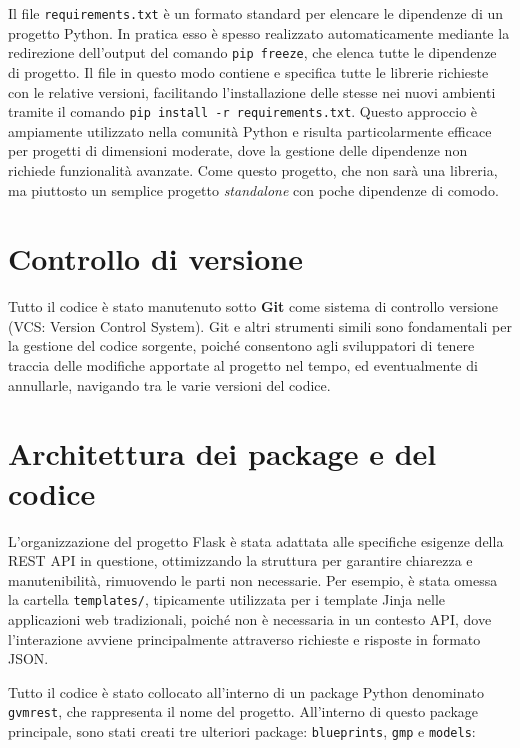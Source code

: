 Il file \texttt{requirements.txt} è un formato standard per elencare le dipendenze di un progetto Python. In pratica esso è spesso realizzato automaticamente mediante la redirezione dell'output del comando \texttt{pip freeze}, che elenca tutte le dipendenze di progetto. Il file in questo modo contiene e specifica tutte le librerie richieste con le relative versioni, facilitando l'installazione delle stesse nei nuovi ambienti tramite il comando \texttt{pip install -r requirements.txt}. Questo approccio è ampiamente utilizzato nella comunità Python e risulta particolarmente efficace per progetti di dimensioni moderate, dove la gestione delle dipendenze non richiede funzionalità avanzate. Come questo progetto, che non sarà una libreria, ma piuttosto un semplice progetto \emph{standalone} con poche dipendenze di comodo.

\section{Controllo di versione}
Tutto il codice è stato manutenuto sotto \textbf{Git} come sistema di controllo versione (VCS: Version Control System). Git e altri strumenti simili sono fondamentali per la gestione del codice sorgente, poiché consentono agli sviluppatori di tenere traccia delle modifiche apportate al progetto nel tempo, ed eventualmente di annullarle, navigando tra le varie versioni del codice.

\section{Architettura dei package e del codice}
L'organizzazione del progetto Flask è stata adattata alle specifiche esigenze della REST API in questione, ottimizzando la struttura per garantire chiarezza e manutenibilità, rimuovendo le parti non necessarie. Per esempio, è stata omessa la cartella \texttt{templates/}, tipicamente utilizzata per i template Jinja nelle applicazioni web tradizionali, poiché non è necessaria in un contesto API, dove l'interazione avviene principalmente attraverso richieste e risposte in formato JSON.

Tutto il codice è stato collocato all'interno di un package Python denominato \texttt{gvmrest}, che rappresenta il nome del progetto. All'interno di questo package principale, sono stati creati tre ulteriori package: \texttt{blueprints}, \texttt{gmp} e \texttt{models}:

